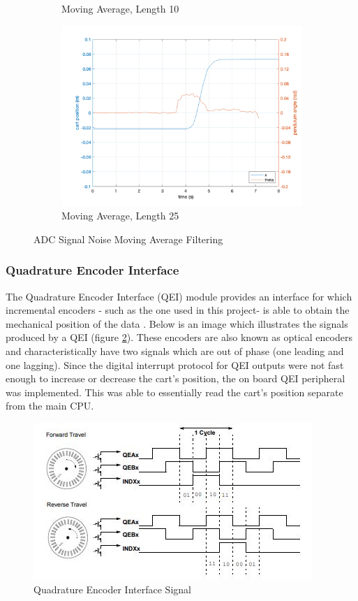 \documentclass[12pt]{article}
\begin{document}
\begin{figure}[H]
\begin{subfigure}{.32\textwidth}
      \caption{Moving Average, Length 10}
    \end{subfigure}
    \begin{subfigure}{.32\textwidth}
      \centering
      \includegraphics[width=1\linewidth]{figures/movAvg25.png}
      \caption{Moving Average, Length 25}
    \end{subfigure}
    \caption{ADC Signal Noise Moving Average Filtering}
    \label{fig:filter}
\end{figure}

\subsubsection{Quadrature Encoder Interface}
The Quadrature Encoder Interface (QEI) module provides an interface for which incremental encoders - such as the one used in this project- is able to obtain the mechanical position of the data \cite{qei}. Below is an image which illustrates the signals produced by a QEI (figure \ref{fig:qei}). These encoders are also known as optical encoders and characteristically have two signals which are out of phase (one leading and one lagging). Since the digital interrupt protocol for QEI outputs were not fast enough to increase or decrease the cart's position, the on board QEI peripheral was implemented. This was able to essentially read the cart's position separate from the main CPU. 

\begin{figure}[H]
    \centering
    \includegraphics[width=.5\linewidth]{figures/qei.JPG}
    \caption{Quadrature Encoder Interface Signal}
    \label{fig:qei}
\end{figure}
\end{document}
